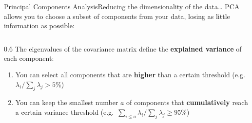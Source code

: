 \begin{frame}{Principal Components Analysis}{Reducing the dimensionality of the data\dots}
    PCA allows you to choose a subset of components from your data, losing as little information as possible:
    \vfill
    \begin{columns}[c]
        \begin{column}{0.6\textwidth}
            The eigenvalues of the covariance matrix define the \textbf{explained variance} of each component:
            \begin{enumerate}
                \item \alert<1>{You can select all components that are \textbf{higher} than a certain threshold (e.g.\ $\lambda_i / \sum_j \lambda_j > 5\%$)}
                \item \alert<2>{You can keep the smallest number $a$ of components that \textbf{cumulatively} reach a certain variance threshold (e.g.\ $\sum_{i \le a} \lambda_i / \sum_j \lambda_j \ge 95\%$)}
            \end{enumerate}
        \end{column}
        \hfil
    \end{columns}
\end{frame}

